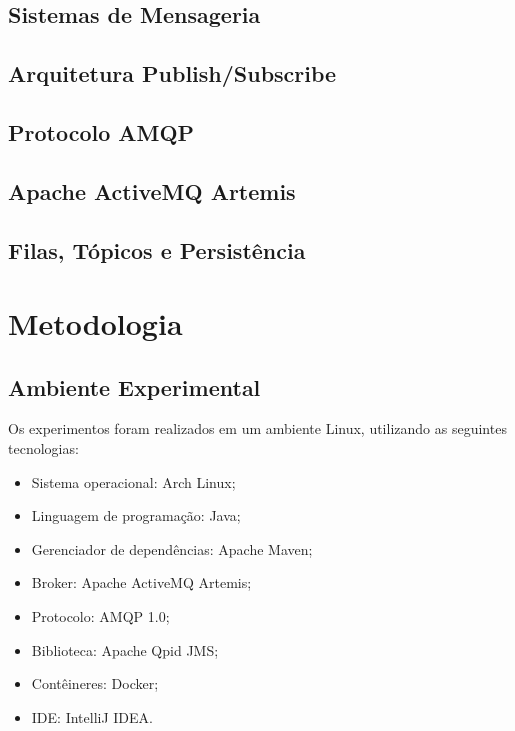 \documentclass[12pt,a4paper]{article}
\begin{document}
\subsection{Sistemas de Mensageria}


\subsection{Arquitetura Publish/Subscribe}


\subsection{Protocolo AMQP}


\subsection{Apache ActiveMQ Artemis}


\subsection{Filas, Tópicos e Persistência}


\section{Metodologia}

\subsection{Ambiente Experimental}

Os experimentos foram realizados em um ambiente
Linux, utilizando as seguintes tecnologias:

\begin{itemize}
    \item Sistema operacional: Arch Linux;
    \item Linguagem de programação: Java;
    \item Gerenciador de dependências: Apache Maven;
    \item Broker: Apache ActiveMQ Artemis;
    \item Protocolo: AMQP 1.0;
    \item Biblioteca: Apache Qpid JMS;
    \item Contêineres: Docker;
    \item IDE: IntelliJ IDEA.
\end{itemize}
\end{document}
